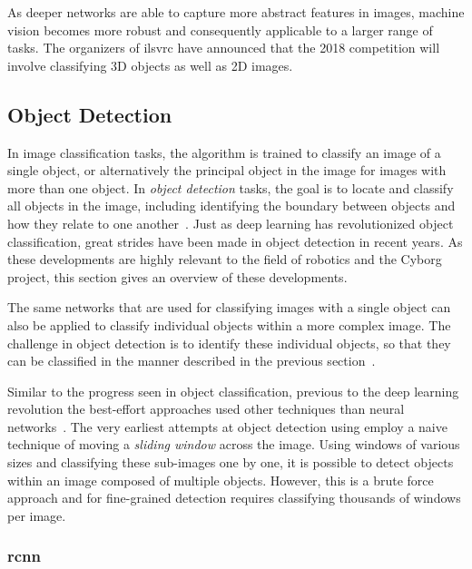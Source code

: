 \documentclass[\rootfolder/main.tex]{subfiles}
\begin{document}
As deeper networks are able to capture more abstract features in images, machine vision becomes more robust and consequently applicable to a larger range of tasks.
The organizers of \acrshort{ilsvrc} have announced that the 2018 competition will involve classifying 3D objects as well as 2D images.


\subsection{Object Detection}

In image classification tasks, the algorithm is trained to classify an image of a single object, or alternatively the principal object in the image for images with more than one object.
In \emph{object detection} tasks, the goal is to locate and classify all objects in the image, including identifying the boundary between objects and how they relate to one another~\cite{Girshick2013}.
Just as deep learning has revolutionized object classification, great strides have been made in object detection in recent years.
As these developments are highly relevant to the field of robotics and the Cyborg project, this section gives an overview of these developments.

The same networks that are used for classifying images with a single object can also be applied to classify individual objects within a more complex image.
The challenge in object detection is to identify these individual objects, so that they can be classified in the manner described in the previous section~\cite{Girshick2013}.

Similar to the progress seen in object classification, previous to the deep learning revolution the best-effort approaches used other techniques than neural networks~\cite{Girshick2013}.
The very earliest attempts at object detection using  employ a naive technique of moving a \emph{sliding window} across the image.
Using windows of various sizes and classifying these sub-images one by one, it is possible to detect objects within an image composed of multiple objects.
However, this is a brute force approach and for fine-grained detection requires classifying thousands of windows per image.

\subsubsection{\acrfull{rcnn}}
\end{document}
